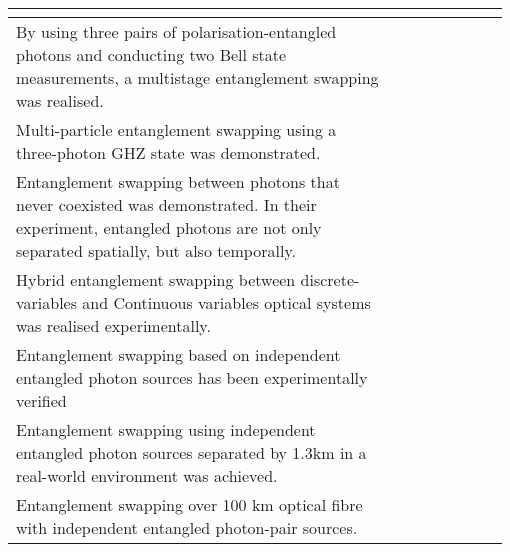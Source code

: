 \begin{table*}[!htbp]
\begin{tabular}{|p{0.755\linewidth}|p{0.22\linewidth}|}
		&\cite{bib:Nat_Phys_8_479}\\
		\hline 
		By using three pairs of polarisation-entangled photons and conducting two Bell state measurements, a multistage entanglement swapping was realised.&\cite{bib:goebel08}\\
		\hline 
		Multi-particle entanglement swapping using a three-photon GHZ state was demonstrated.&\cite{bib:PRL_103_020501}\\
		\hline
		Entanglement swapping between photons that never coexisted was demonstrated. In their experiment, entangled photons are not only separated spatially, but also temporally.&\cite{bib:PRL_110_210403}\\
		\hline
		Hybrid entanglement swapping between discrete-variables and Continuous variables optical systems was realised experimentally.&\cite{bib:takeda2015entanglement}\\
		\hline
		Entanglement swapping based on independent entangled photon sources has been experimentally verified 
		& \cite{bib:PRL_96_110501, bib:Nat_Phys_3_692, bib:PRA_79_040302}\\
		\hline
		Entanglement swapping using independent entangled photon sources separated by 1.3km in a real-world environment was achieved. &\cite{bib:hensen2015loophole}\\
		\hline
		 Entanglement swapping over 100 km optical fibre with independent entangled photon-pair sources.&\cite{bib:sun2017entanglement}\\

\end{tabular}
\end{table*}

